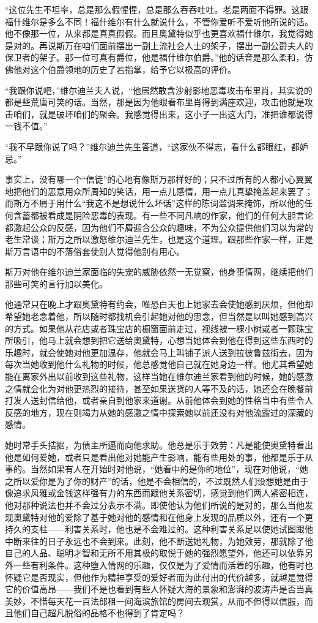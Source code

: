 \par “这位先生不坦率，总是那么假惺惺，总是那么吞吞吐吐。老是两面不得罪。这跟福什维尔是多么不同！福什维尔有什么就说什么，不管你爱听不爱听他所说的话。他不像那一位，从来都是真真假假。而且奥黛特似乎也更喜欢福什维尔，我觉得她是对的。再说斯万在咱们面前摆出一副上流社会人士的架子，摆出一副公爵夫人的保卫者的架子。那一位可真有爵位，他是福什维尔伯爵。”他的话音是那么柔和，仿佛他对这个伯爵领地的历史了若指掌，给予它以极高的评价。
\par “我跟你说吧，”维尔迪兰夫人说，“他居然敢含沙射影地恶毒攻击布里肖，其实说的都是些荒唐可笑的话。当然，那是因为他眼看布里肖得到满座欢迎，攻击他就是攻击咱们，就是破坏咱们的聚会。我感觉得出来，这小子一出这大门，准把谁都说得一钱不值。”
\par “我不早跟你说了吗？”维尔迪兰先生答道，“这家伙不得志，看什么都眼红，都妒忌。”
\par 事实上，没有哪一个“信徒”的心地有像斯万那样好的；只不过所有的人都小心翼翼地把他们的恶意用众所周知的笑话，用一点儿感情，用一点儿真挚掩盖起来罢了；而斯万不屑于用什么“我这不是想说什么坏话”这样的陈词滥调来掩饰，所以他的任何含蓄都被看成是阴险恶毒的表现。有一些不同凡响的作家，他们的任何大胆言论都激起公众的反感，因为他们不屑迎合公众的趣味，不为公众提供他们习以为常的老生常谈；斯万之所以激怒维尔迪兰先生，也是这个道理。跟那些作家一样，正是斯万言语中的不落俗套使别人觉得他别有用心。
\par 斯万对他在维尔迪兰家面临的失宠的威胁依然一无觉察，他身堕情网，继续把他们那些可笑的言行加以美化。
\par 他通常只在晚上才跟奥黛特有约会，唯恐白天也上她家去会使她感到厌烦，但他却希望她老念着他，所以随时都找机会引起她对他的思念，但当然是以叫她感到高兴的方式。如果他从花店或者珠宝店的橱窗面前走过，视线被一棵小树或者一颗珠宝所吸引，他马上就会想到把它送给奥黛特，心想当她体会到他在得到这些东西时的乐趣时，就会使她对他更加温存，他就会马上叫铺子派人送到拉彼鲁兹街去，因为每次当她收到他什么礼物的时候，他总感觉他自己就在她身边一样。他尤其希望她能在离家外出以前收到这些礼物，这样当她在维尔迪兰家看到他的时候，她的感激之情就会化为对他更热烈的接待，甚至如果送货的人等不及的话，她还会在晚餐前打发人送封信给他，或者亲自到他家来道谢。从前他体会到她的性格当中有些令人反感的地方，现在则竭力从她的感激之情中探索她以前还没有对他流露过的深藏的感情。
\par 她时常手头拮据，为债主所逼而向他求助。他总是乐于效劳：凡是能使奥黛特看出他是如何爱她，或者只是看出他对她能产生影响，能有些用处的事，他都是乐于从事的。当然如果有人在开始时对他说，“她看中的是你的地位”，现在对他说，“她之所以爱你是为了你的财产”的话，他是不会相信的，不过既然人们设想她是由于像追求风雅或金钱这样强有力的东西而跟他关系密切，感觉到他们两人紧密相连，他对那种说法也并不会过分表示不满。即使他认为他们所说的是对的，那么当他发现奥黛特对他的爱除了基于她对他的感情和在他身上发现的品质以外，还有一个更持久的支柱——利害关系时，他也是不会难过的。这种利害关系足以使她试图跟他中断来往的日子永远也不会到来。此刻，他不断送她礼物，为她效劳，那就除了他自己的人品、聪明才智和无所不用其极的取悦于她的强烈愿望外，他还可以依靠另外一些有利条件。这种堕入情网的乐趣，仅仅是为了爱情而活着的乐趣，他有时也怀疑它是否现实，但他作为精神享受的爱好者而为此付出的代价越多，就越是觉得它的价值高昂——我们不是也看到有些人怀疑大海的景象和澎湃的波涛声是否当真美妙，不惜每天花一百法郎租一间海滨旅馆的房间去观赏，从而不但得以信服，而且他们自己超凡脱俗的品格不也得到了肯定吗？
